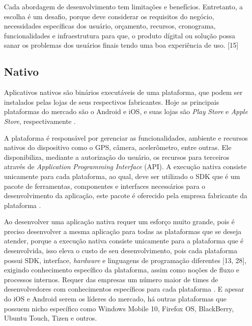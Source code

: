 Cada abordagem de desenvolvimento tem limitações e benefícios. Entretanto, a escolha é um desafio, porque deve considerar os requisitos do negócio, necessidades específicas dos usuário, orçamento, recursos, cronograma, funcionalidades e infraestrutura para que, o produto dígital ou solução possa sanar os problemas dos usuários finais tendo uma boa experiência de uso. [15]

\subsection{\esp Nativo}

Aplicativos nativos são binários executáveis de uma plataforma, que podem ser instalados pelas lojas de seus respectivos fabricantes. Hoje as principais plataformas do mercado são o Android e iOS, e suas lojas são \textit{Play Store} e \textit{Apple Store}, respectivamente \cite{14-ibm}.

A plataforma é responsável por gerenciar as funcionalidades, ambiente e recursos nativos do dispositivo como o GPS, câmera, acelerômetro, entre outras. Ele disponibiliza, mediante a autorização do usuário, os recursos para terceiros através de \textit{Application Programming Interface} (API). A execução nativa consiste unicamente para cada plataforma, ao qual, deve ser utilizado o SDK que é um pacote de ferramentas, componentes e interfaces necessários para o desenvolvimento da aplicação, este pacote é oferecido pela empresa fabricante da plataforma \cite{14-ibm}.

Ao desenvolver uma aplicação nativa requer um esforço muito grande, pois é preciso desenvolver a mesma aplicação para todas as plataformas que se deseja atender, porque a execução nativa consiste unicamente para a plataforma que é desenvolvida, isso eleva o custo de seu desenvolvimento, pois cada plataforma possui SDK, interface, \textit{hardware} e linguagens de programação diferentes \cite{14-ibm}[13, 28], exigindo conhecimento específico da plataforma, assim como noções de fluxo e processos internos. Requer das empresas um número maior de times de desenvolvedores com conhecimentos específicos para cada plataforma \cite{14-ibm}. E apesar do iOS e Android serem os líderes do mercado, há outras plataformas que possuem nicho específico como Windows Mobile 10, Firefox OS, BlackBerry, Ubuntu Touch, Tizen e outros.

